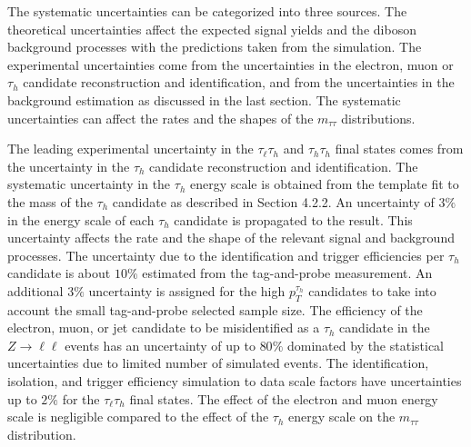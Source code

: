 The systematic uncertainties can be categorized into three sources. The theoretical uncertainties affect the expected signal yields and the diboson background processes with the predictions taken from the simulation. The experimental uncertainties come from the uncertainties in the electron, muon or $\tau_h$ candidate reconstruction and identification, and from the uncertainties in the background estimation as discussed in the last section. The systematic uncertainties can affect the rates and the shapes of the $m_{\tau\tau}$ distributions. 

The leading experimental uncertainty in the $\tau_{\ell}\tau_h$ and $\tau_h\tau_h$ final states comes from the uncertainty in the $\tau_h$ candidate reconstruction and identification. The systematic uncertainty in the $\tau_h$ energy scale is obtained from the template fit to the mass of the $\tau_h$ candidate as described in Section 4.2.2. An uncertainty of $3\%$ in the energy scale of each $\tau_h$ candidate is propagated to the result. This uncertainty affects the rate and the shape of the relevant signal and background processes. The uncertainty due to the identification and trigger efficiencies per $\tau_h$ candidate is about $10\%$ estimated from the tag-and-probe measurement. An additional $3\%$ uncertainty is assigned for the high $p_{T}^{\tau_h}$ candidates to take into account the small tag-and-probe selected sample size. The efficiency of the electron, muon, or jet candidate to be misidentified as a $\tau_h$ candidate in the $Z\rightarrow\ell\ell$ events has an uncertainty of up to $80\%$ dominated by the statistical uncertainties due to limited number of simulated events. The identification, isolation, and trigger efficiency simulation to data scale factors have uncertainties up to $2\%$ for the $\tau_{\ell}\tau_h$ final states. The effect of the electron and muon energy scale is negligible compared to the effect of the $\tau_h$ energy scale on the $m_{\tau\tau}$ distribution. 
